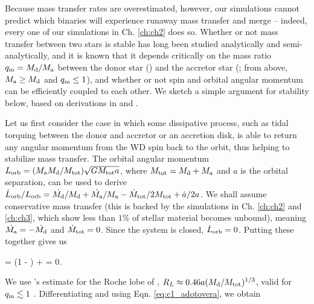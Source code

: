 

Because mass transfer rates are overestimated, however, our simulations cannot predict which binaries will experience runaway mass transfer and merge -- indeed, every one of our simulations in Ch. \ref{ch:ch2} does so.  Whether or not mass transfer between two stars is stable has long been studied analytically and semi-analytically, and it is known that it depends critically on the mass ratio $\qm = \Md/\Ma$ between the donor star (\Md) and the accretor star (\Ma; from above, $\Ma \geq \Md$ and $\qm \leq 1$), and whether or not spin and orbital angular momentum can be efficiently coupled to each other.  We sketch a simple argument for stability below, {\charles based on derivations in \cite{marsns04} and \cite{dan+11}.}

Let us first consider the case in which some dissipative process, such as tidal torquing between the donor and accretor or an accretion disk, is able to return any angular momentum from the WD spin back to the orbit, thus helping to stabilize mass transfer.  {\charles The orbital angular momentum $L_\mrm{orb} = (\Ma\Md/\Mtot)\sqrt{G\Mtot a}$, where $\Mtot = \Md + \Ma$ and $a$ is the orbital separation, can be used to derive $\dot{L}_\mrm{orb}/L_\mrm{orb} = \dot{\Md}/\Md + \dot{\Ma}/\Ma - \dot{M}_\mrm{tot}/2\Mtot + \dot{a}/2a$.  We shall assume conservative mass transfer (this is backed by the simulations in Ch. \ref{ch:ch2} and \ref{ch:ch3}, which show less than $1$\% of stellar material becomes unbound), meaning $\dot{\Ma} = -\dot{\Md}$ and $\dot{M}_\mathrm{tot} = 0$.}  Since the system is closed, $\dot{L}_\mathrm{orb} = 0$.  Putting these together gives us

\eqbegin
{} = (1 - \qm)\frac{\dot{\Md}}{\Md} +  = 0.
\label{eq:c1_adotovera}
\eqend

\noindent We use \cite{pacz71}'s estimate for the Roche lobe of \Md, $R_L \approx 0.46a(\Md/\Mtot)^{1/3}$, valid for $\qm \lesssim 1$ \citep{eggl83}.  Differentiating and using Eqn. \ref{eq:c1_adotovera}, we obtain

